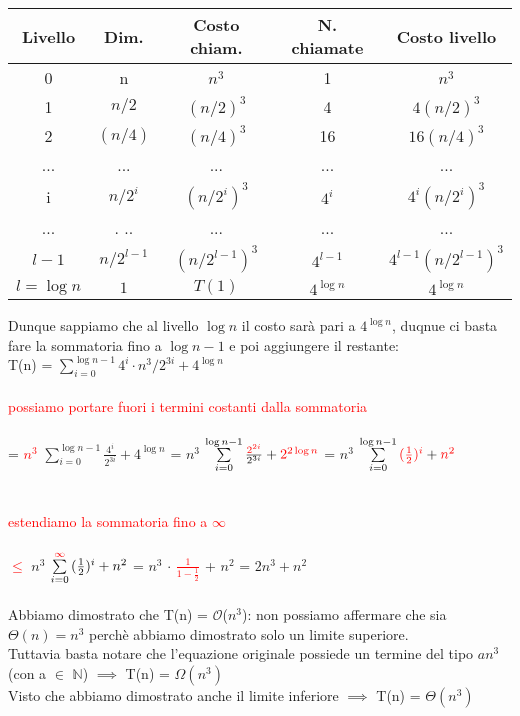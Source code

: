 \documentclass[../cheatSheetAlgoritmi.tex]{subfiles}
\begin{document}
\begin{center}
	\renewcommand{\arraystretch}{1.2}
	\begin{tabular}{ |c|c|c|c|c| } 
		\hline
			Livello & Dim. & Costo chiam. & N. chiamate & Costo livello \\ 
		\hline
			0 & n & $n^3$ & 1 & $n^3$ \\ 
		\hline
			1 & $n/2$ & $(n/2)^{3}$ & 4 & $4(n/2)^{3}$\\ 
		\hline
			2 & $(n/4)$ & $(n/4)^{3}$ & 16 & $16(n/4)^{3}$\\
		\hline
			... & ... & ... & ... & ...\\
		\hline
			i & $n/2^{i}$ & $(n/2^{i})^{3}$ & $4^{i}$ & $4^{i}(n/2^{i})^{3}$\\
		\hline
			... & .	.. & ... & ... & ...\\
		\hline
			$l-1$ & $n/2^{l-1}$ & $(n/2^{l-1})^{3}$ & $4^{l-1}$ & $4^{l-1}(n/2^{l-1})^{3}$\\
		\hline
			$l = \log{n}$ & $1$ & $T(1)$ & $4^{\log{n}}$ & $4^{\log{n}}$\\
		\hline
	\end{tabular}
\end{center}
Dunque sappiamo che al livello $\log{n}$ il costo sarà pari a $4^{\log{n}}$, duqnue ci basta fare la sommatoria fino a $\log{n-1}$ e poi aggiungere il restante:\\
T(n) =  $\sum\limits_{i=0}^{\log{n-1}} {4^{i} \cdot n^{3}/2^{3i}} + 4^{\log{n}}$\\\\
\textcolor{red}{possiamo portare fuori i termini costanti dalla sommatoria}\\\\
= \textcolor{red}{$n^{3}$} $\sum\limits_{i=0}^{\log{n-1}} {\frac{4^{i}}{2^{3i}}} + 4^{\log{n}}$ = $n^{3}$ $\sum\limits_{i=0}^{\log{n-1}} {\frac{\textcolor{red}{2^{2i}}}{2^{3i}}} + \textcolor{red}{2^{2\log{n}}}$ = $n^{3}$ $\sum\limits_{i=0}^{\log{n-1}} {\textcolor{red}{(\frac{1}{2})^{i}}} + \textcolor{red}{n^{2}}$\\\\\\
\textcolor{red}{estendiamo la sommatoria fino a $\infty$}\\\\
\textcolor{red}{$\leq$} $n^{3}$ $\sum\limits_{i=0}^{\textcolor{red}{\infty}} {(\frac{1}{2})^{i}} + n^{2}$ = 
$n^{3}$ $\cdot$ \textcolor{red}{$\frac{1}{1-\frac{1}{2}}$} + $n^{2}$ = $2n^{3} + n^2$\\\\
Abbiamo dimostrato che T(n) = $\mathcal{O}$($n^{3}$): non possiamo affermare che sia $\Theta(n) = n^{3}$ perchè abbiamo dimostrato solo un limite superiore.\\
Tuttavia basta notare che l'equazione originale possiede un termine del tipo $an^{3}$ (con a $\in$ $\mathbb{N}$) $\implies$ T(n) = $\Omega(n^{3})$\\  
Visto che abbiamo dimostrato anche il limite inferiore $\implies$ T(n) = $\Theta(n^{3})$ 
\end{document}

